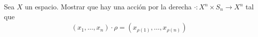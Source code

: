 \begin{ejercicio}
    Sea $X$ un espacio. Mostrar que hay una acción por la derecha $\cdot: X^n\times S_n\to X^n$ tal que
    \begin{align*}
        (x_1,\ldots,x_n)\cdot \rho=(x_{\rho(1)},\ldots,x_{\rho(n)})
    \end{align*}
\end{ejercicio}

\begin{demostracion}

\end{demostracion}
